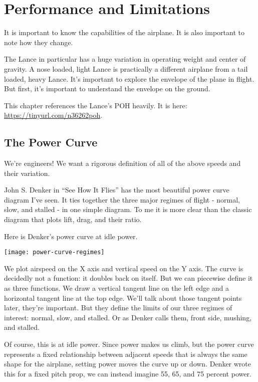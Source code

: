 \chapter{Performance and Limitations}

It is important to know the capabilities of the airplane. It is also important to note how they change.

The Lance in particular has a huge variation in operating weight and center of gravity. A nose loaded, light Lance is practically a different airplane from a tail loaded, heavy Lance. It's important to explore the envelope of the plane in flight. But first, it's important to understand the envelope on the ground.

This chapter references the Lance's POH heavily. It is here: \url{https://tinyurl.com/n36262poh}.


\section{The Power Curve}

We're engineers! We want a rigorous definition of all of the above speeds and their variation.

John S. Denker in ``See How It Flies'' has the most beautiful power curve diagram I've seen. It ties together the three major regimes of flight - normal, slow, and stalled - in one simple diagram. To me it is more clear than the classic diagram that plots lift, drag, and their ratio.

Here is Denker's power curve at idle power.

\texttt{[image: power-curve-regimes]}

We plot airspeed on the X axis and vertical speed on the Y axis. The curve is decidedly not a function: it doubles back on itself. But we can piecewise define it as three functions. We draw a vertical tangent line on the left edge and a horizontal tangent line at the top edge. We'll talk about those tangent points later, they're important. But they define the limits of our three regimes of interest: normal, slow, and stalled. Or as Denker calls them, front side, mushing, and stalled.

Of course, this is at idle power. Since power makes us climb, but the power curve represents a fixed relationship between adjacent speeds that is always the same shape for the airplane, setting power moves the curve up or down. Denker wrote this for a fixed pitch prop, we can instead imagine 55, 65, and 75 percent power.

